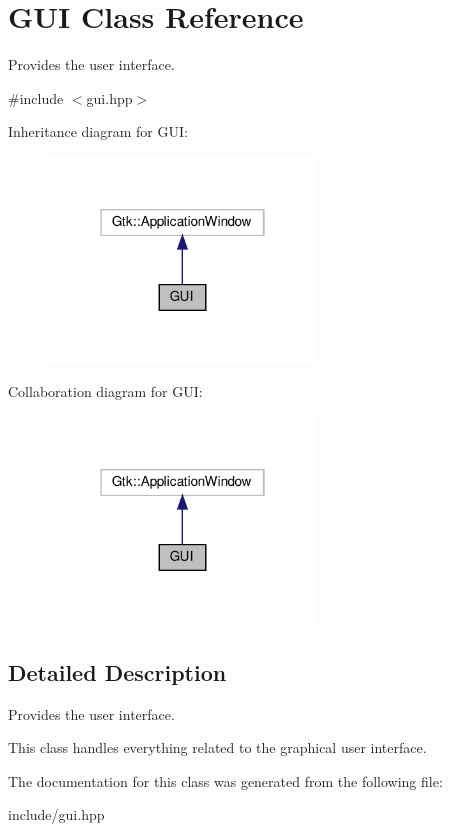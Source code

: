 \hypertarget{classGUI}{}\section{G\+UI Class Reference}
\label{classGUI}


Provides the user interface.  




{\ttfamily \#include $<$gui.\+hpp$>$}



Inheritance diagram for G\+UI\+:
\nopagebreak
\begin{figure}[H]
\begin{center}
\leavevmode
\includegraphics[width=202pt]{classGUI__inherit__graph}
\end{center}
\end{figure}


Collaboration diagram for G\+UI\+:
\nopagebreak
\begin{figure}[H]
\begin{center}
\leavevmode
\includegraphics[width=202pt]{classGUI__coll__graph}
\end{center}
\end{figure}


\subsection{Detailed Description}
Provides the user interface. 

This class handles everything related to the graphical user interface. 

The documentation for this class was generated from the following file\+:\begin{DoxyCompactItemize}
\item 
include/gui.\+hpp\end{DoxyCompactItemize}
